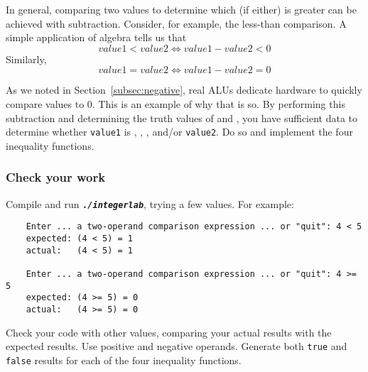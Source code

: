 In general, comparing two values to determine which (if either) is greater can be achieved with subtraction.
Consider, for example, the less-than comparison.
A simple application of algebra tells us that \[value1 < value2 \Leftrightarrow value1 - value2 < 0\]
Similarly, \[value1 = value2 \Leftrightarrow value1 - value2 = 0\]

As we noted in Section~\ref{subsec:negative}, real ALUs dedicate hardware to quickly compare values to 0.
This is an example of why that is so.
By performing this subtraction and determining the truth values of  and , you have sufficient data to determine whether \lstinline{value1} is , , , and/or  \lstinline{value2}.
Do so and implement the four inequality functions.


\subsubsection*{Check your work}

Compile and run \texttt{\textbf{\textit{./integerlab}}}, trying a few values.
For example:
\begin{verbatim}
    Enter ... a two-operand comparison expression ... or "quit": 4 < 5
    expected: (4 < 5) = 1
    actual:   (4 < 5) = 1

    Enter ... a two-operand comparison expression ... or "quit": 4 >= 5
    expected: (4 >= 5) = 0
    actual:   (4 >= 5) = 0
\end{verbatim}

Check your code with other values, comparing your actual results with the expected results.
Use positive and negative operands.
Generate both \lstinline{true} and \lstinline{false} results for each of the four inequality functions.
